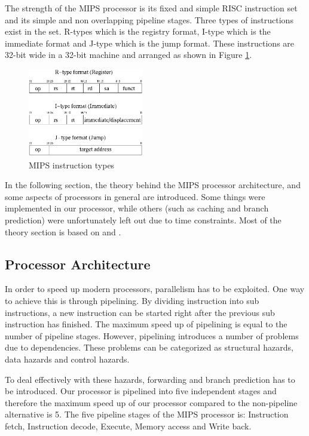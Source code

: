 The strength of the MIPS processor is its fixed and simple RISC instruction set and its simple and non overlapping pipeline stages. Three types of instructions exist in the set. R-types which is the registry format, I-type which is the immediate format and J-type which is the jump format. These instructions are 32-bit wide in a 32-bit machine and arranged as shown in Figure \ref{fig:ISA}. %

\begin{figure}[!h] 
\includegraphics[width=0.45\textwidth]{Images/image.png}
\caption{MIPS instruction types}
\label{fig:ISA}
\end{figure}

In the following section, the theory behind the MIPS processor architecture, and some aspects of processors in general are introduced. Some things were implemented in our processor, while others (such as caching and branch prediction) were unfortunately left out due to time constraints. Most of the theory section is based on \cite{Patterson:2008:COD:1502247} and \cite{CompArch}.

\subsection{Processor Architecture}
In order to speed up modern processors, parallelism has to be exploited. One way to achieve this is through pipelining. By dividing instruction into sub instructions, a new instruction can be started right after the previous sub instruction has finished. The maximum speed up of pipelining is equal to the number of pipeline stages. However, pipelining introduces a number of problems due to dependencies. These problems can be categorized as structural hazards, data hazards and control hazards.

To deal effectively with these hazards, forwarding and branch prediction has to be introduced. Our processor is pipelined into five independent stages and therefore the maximum speed up of our processor compared to the non-pipeline alternative is 5. The five pipeline stages of the MIPS processor is: Instruction fetch, Instruction decode, Execute, Memory access and Write back.

